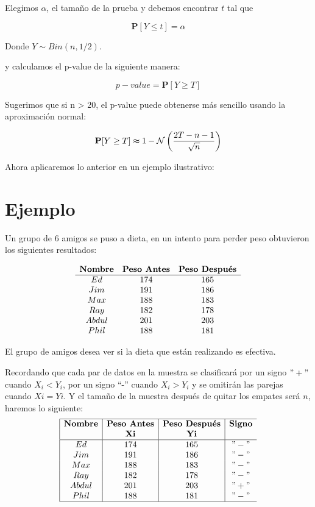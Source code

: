 \documentclass[a4paper,oneside,openany]{book}
\begin{document}
Elegimos \(\alpha\), el tamaño de la prueba y debemos encontrar \(t\)
tal que

\[\mathbf{P}[Y \leq t]=\alpha\]

Donde \(Y \sim Bin (n,1/2)\).

y calculamos el p-value de la siguiente manera:

\[p-value=\mathbf{P}[Y\geq T]\]

Sugerimos que si n \textgreater{} 20, el p-value puede obtenerse más
sencillo usando la aproximación normal:

\[\mathbf{P}[Y\geq T] \thickapprox 1- \mathcal{N} \left(\frac{2T-n-1}{\sqrt{n}}\right)\]

Ahora aplicaremos lo anterior en un ejemplo ilustrativo:

\section{Ejemplo}\label{ejemplo-2}

Un grupo de 6 amigos se puso a dieta, en un intento para perder peso
obtuvieron los siguientes resultados:

\[
\begin{equation*}
\begin{array}{c c c c } 
\textbf{Nombre} & \textbf{Peso Antes} & \textbf{Peso Después} \\
\hline
Ed    & 174 & 165 \\
Jim   & 191 & 186 \\
Max   & 188 & 183 \\
Ray   & 182 & 178 \\
Abdul & 201 & 203 \\
Phil  & 188 & 181 \\
\end{array} 
\end{equation*} 
\]

El grupo de amigos desea ver si la dieta que están realizando es
efectiva.

Recordando que cada par de datos en la muestra se clasificará por un
signo \("+"\) cuando \(X_{i} < Y_{i}\), por un signo ``-'' cuando
\(X_{i} > Y_{i}\) y se omitirán las parejas cuando \(Xi = Yi\). Y el
tamaño de la muestra después de quitar los empates será \(n\), haremos
lo siguiente: \[
\begin{equation*}
\begin{array}{|c |c |c |c c c|}
\hline
\textbf{Nombre} & \textbf{Peso Antes} & \textbf{Peso Después} & \textbf{Signo} \\
 & \textbf{Xi} & \textbf{Yi} & \\
 \hline
Ed    & 174 & 165  &  "-"   \\
Jim   & 191 & 186  &  "-" \\
Max   & 188 & 183  &  "-" \\
Ray   & 182 & 178  &  "-" \\
Abdul & 201 & 203  &  "+" \\
Phil  & 188 & 181  &  "-"  \\
\hline
\end{array} 
\end{equation*} 
\]
\end{document}
